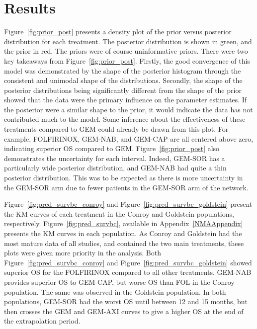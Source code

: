\section{Results}
Figure~\ref{fig:prior_post} presents a density plot of the prior versus posterior distribution for each treatment. The posterior distribution is shown in green, and the prior in red. The priors were of course uninformative priors. There were two key takeaways from Figure~\ref{fig:prior_post}. Firstly, the good convergence of this model was demonstrated by the shape of the posterior histogram through the consistent and unimodal shape of the distributions. Secondly, the shape of the posterior distributions being significantly different from the shape of the prior showed that the data were the primary influence on the parameter estimates. If the posterior were a similar shape to the prior, it would indicate the data has not contributed much to the model. Some inference about the effectiveness of these treatments compared to GEM could already be drawn from this plot. For example, FOLFIRINOX, GEM-NAB, and GEM-CAP are all centered above zero, indicating superior OS compared to GEM. Figure~\ref{fig:prior_post} also demonstrates the uncertainty for each interval. Indeed, GEM-SOR has a particularly wide posterior distribution, and GEM-NAB had quite a thin posterior distribution. This was to be expected as there is more uncertainty in the GEM-SOR arm due to fewer patients in the GEM-SOR arm of the network.

Figure~\ref{fig:pred_survbc_conroy} and Figure~\ref{fig:pred_survbc_goldstein} present the KM curves of each treatment in the Conroy and Goldstein populations, respectively. Figure~\ref{fig:pred_survbc}, available in Appendix~\ref{NMAAppendix} presents the KM curves in each population. As Conroy and Goldstein had the most mature data of all studies, and contained the two main treatments, these plots were given more priority in the analysis. Both Figure~\ref{fig:pred_survbc_conroy} and Figure~\ref{fig:pred_survbc_goldstein} showed superior OS for the FOLFIRINOX compared to all other treatments. GEM-NAB provides superior OS to GEM-CAP, but worse OS than FOL in the Conroy population. The same was observed in the Goldstein population. In both populations, GEM-SOR had the worst OS until between 12 and 15 months, but then crosses the GEM and GEM-AXI curves to give a higher OS at the end of the extrapolation period. \\

